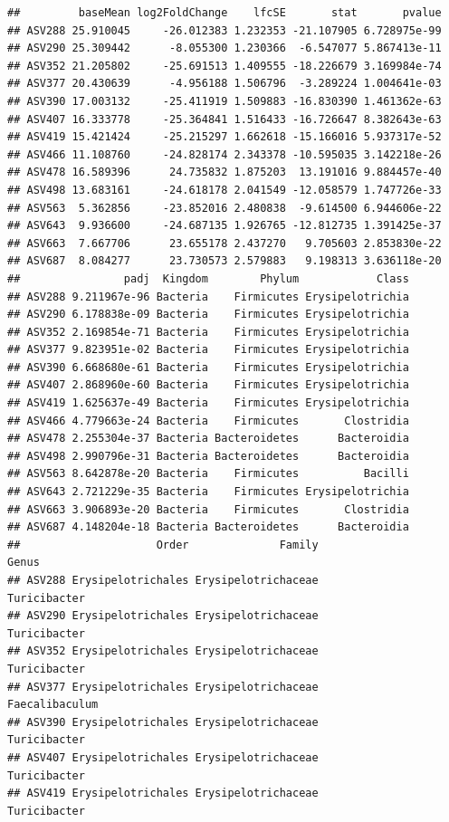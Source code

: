 \documentclass[]{article}
\begin{document}
\begin{verbatim}
##         baseMean log2FoldChange    lfcSE       stat       pvalue
## ASV288 25.910045     -26.012383 1.232353 -21.107905 6.728975e-99
## ASV290 25.309442      -8.055300 1.230366  -6.547077 5.867413e-11
## ASV352 21.205802     -25.691513 1.409555 -18.226679 3.169984e-74
## ASV377 20.430639      -4.956188 1.506796  -3.289224 1.004641e-03
## ASV390 17.003132     -25.411919 1.509883 -16.830390 1.461362e-63
## ASV407 16.333778     -25.364841 1.516433 -16.726647 8.382643e-63
## ASV419 15.421424     -25.215297 1.662618 -15.166016 5.937317e-52
## ASV466 11.108760     -24.828174 2.343378 -10.595035 3.142218e-26
## ASV478 16.589396      24.735832 1.875203  13.191016 9.884457e-40
## ASV498 13.683161     -24.618178 2.041549 -12.058579 1.747726e-33
## ASV563  5.362856     -23.852016 2.480838  -9.614500 6.944606e-22
## ASV643  9.936600     -24.687135 1.926765 -12.812735 1.391425e-37
## ASV663  7.667706      23.655178 2.437270   9.705603 2.853830e-22
## ASV687  8.084277      23.730573 2.579883   9.198313 3.636118e-20
##                padj  Kingdom        Phylum            Class
## ASV288 9.211967e-96 Bacteria    Firmicutes Erysipelotrichia
## ASV290 6.178838e-09 Bacteria    Firmicutes Erysipelotrichia
## ASV352 2.169854e-71 Bacteria    Firmicutes Erysipelotrichia
## ASV377 9.823951e-02 Bacteria    Firmicutes Erysipelotrichia
## ASV390 6.668680e-61 Bacteria    Firmicutes Erysipelotrichia
## ASV407 2.868960e-60 Bacteria    Firmicutes Erysipelotrichia
## ASV419 1.625637e-49 Bacteria    Firmicutes Erysipelotrichia
## ASV466 4.779663e-24 Bacteria    Firmicutes       Clostridia
## ASV478 2.255304e-37 Bacteria Bacteroidetes      Bacteroidia
## ASV498 2.990796e-31 Bacteria Bacteroidetes      Bacteroidia
## ASV563 8.642878e-20 Bacteria    Firmicutes          Bacilli
## ASV643 2.721229e-35 Bacteria    Firmicutes Erysipelotrichia
## ASV663 3.906893e-20 Bacteria    Firmicutes       Clostridia
## ASV687 4.148204e-18 Bacteria Bacteroidetes      Bacteroidia
##                     Order              Family                       Genus
## ASV288 Erysipelotrichales Erysipelotrichaceae                Turicibacter
## ASV290 Erysipelotrichales Erysipelotrichaceae                Turicibacter
## ASV352 Erysipelotrichales Erysipelotrichaceae                Turicibacter
## ASV377 Erysipelotrichales Erysipelotrichaceae              Faecalibaculum
## ASV390 Erysipelotrichales Erysipelotrichaceae                Turicibacter
## ASV407 Erysipelotrichales Erysipelotrichaceae                Turicibacter
## ASV419 Erysipelotrichales Erysipelotrichaceae                Turicibacter

\end{verbatim}
\end{document}
